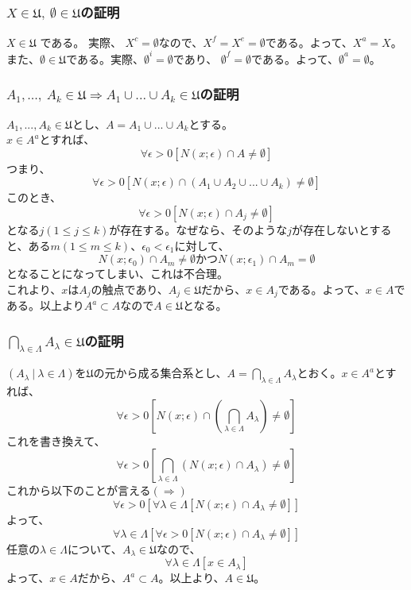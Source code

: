 \documentclass{jsarticle}
\begin{document}
\subsection{}
\subsubsection{$X\in \mathfrak{U},\ \emptyset\in\mathfrak{U}$の証明}
$X\in \mathfrak{U}$ である。
実際、
$X^c=\emptyset$なので、$X^f=X^e=\emptyset$である。よって、$X^a=X$。\\
また、$\emptyset\in\mathfrak{U}$である。実際、$\emptyset^i=\emptyset$であり、 $\emptyset^f=\emptyset$である。よって、$\emptyset^a=\emptyset$。

\subsubsection{$A_1,...,\ A_k\in\mathfrak{U}\Longrightarrow A_1\cup...\cup A_k\in\mathfrak{U}$の証明}
$A_1,...,A_k\in \mathfrak{U}$とし、$A=A_1\cup...\cup A_k$とする。\\
$x\in A^a$とすれば、
\[\forall \epsilon >0 [N(x;\epsilon)\cap A\neq \emptyset]\]
つまり、
\[\forall \epsilon >0 [N(x;\epsilon)\cap (A_1\cup A_2\cup ...\cup A_k)\neq \emptyset]\]
このとき、
\[\forall\epsilon >0[N(x;\epsilon)\cap A_j\neq \emptyset]\]
となる$j(1\leq j \leq k)$が存在する。なぜなら、そのような$j$が存在しないとすると、ある$m(1\leq m\leq k)$、$\epsilon_0<\epsilon_1$に対して、
\[N(x;\epsilon_0)\cap A_m\neq \emptyset　かつ　N(x;\epsilon_1)\cap A_m = \emptyset\]
となることになってしまい、これは不合理。\\
これより、$x$は$A_j$の触点であり、$A_j\in\mathfrak{U}$だから、$x\in A_j$である。よって、$x\in A$である。以上より$A^a\subset A$なので$A\in\mathfrak{U}$となる。

\subsubsection{$\bigcap_{\lambda\in\Lambda}A_\lambda\in\mathfrak{U}$の証明}
$(A_\lambda\ |\ \lambda\in\Lambda)$を$\mathfrak{U}$の元から成る集合系とし、$A=\bigcap_{\lambda\in\Lambda}A_\lambda$とおく。$x\in A^a$とすれば、
\[\forall\epsilon>0[N(x;\epsilon)\cap(\bigcap_{\lambda\in\Lambda}A_\lambda)\neq\emptyset]\]
これを書き換えて、
\[\forall\epsilon>0[\bigcap_{\lambda\in\Lambda}(N(x;\epsilon)\cap A_\lambda)\neq\emptyset]\]
これから以下のことが言える$(\Longrightarrow)$
\[\forall\epsilon>0[\forall\lambda\in\Lambda[N(x;\epsilon)\cap A_\lambda\neq\emptyset]]\]
よって、
\[\forall\lambda\in\Lambda[\forall\epsilon>0[N(x;\epsilon)\cap A_\lambda\neq\emptyset]]\]
任意の$\lambda\in\Lambda$について、$A_\lambda\in\mathfrak{U}$なので、
\[\forall\lambda\in\Lambda[x\in A_\lambda]\]
よって、$x\in A$だから、$A^a\subset A$。以上より、$A\in\mathfrak{U}$。
\end{document}
